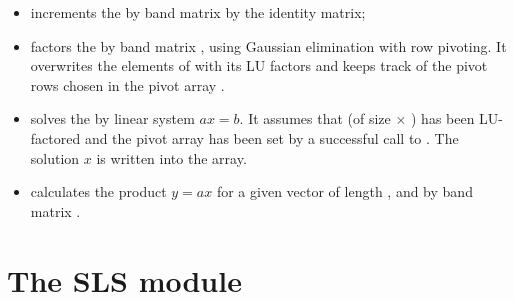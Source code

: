 \begin{itemize}
\item {}
  \par {} increments the  by  band matrix  by the
  identity matrix;

\item {}
  \par {} factors the  by  band matrix ,
  using Gaussian elimination with row pivoting. 
  It overwrites the elements of  with its LU factors and keeps track of the
  pivot rows chosen in the pivot array .

\item {}
  \par {} solves the  by  linear system $ax = b$. 
  It assumes that  (of size  $\times$ ) has been LU-factored 
  and the pivot array  has been set by a successful call to 
  . The solution $x$ is written into the  array.

\item {}
  \par {} calculates the product $y = ax$ for a given vector
   of length , and  by  band matrix .

\end{itemize}


\section{The SLS module}\label{s:sls}

